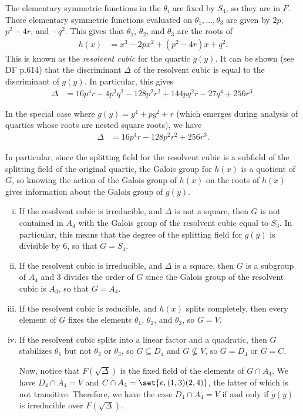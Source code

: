 \documentclass[10pt]{mypackage}
\begin{document}
The elementary symmetric functions in the $\theta_i$ are fixed by $S_4$, so they are in $F$. These elementary symmetric functions evaluated on $\theta_1,\dots,\theta_3$ are given by $2p$, $p^2-4r$, and $-q^2$. This gives that $\theta_1$, $\theta_2$, and $\theta_3$ are the roots of
\begin{align*}
  h(x) &= x^3 - 2px^2 + \left( p^2-4r \right)x + q^2.
\end{align*}
This is known as the \textit{resolvent cubic} for the quartic $g(y)$. It can be shown (see DF p.614) that the discriminant $\Delta$ of the resolvent cubic is equal to the discriminant of $g(y)$. In particular, this gives
\begin{align*}
  \Delta &= 16p^{4}r - 4p^3q^2 - 128p^2r^2 + 144pq^2r - 27q^{4} + 256r^3.
\end{align*}
\begin{remark}
  In the special case where $g(y) = y^4 + py^2 + r$ (which emerges during analysis of quartics whose roots are nested square roots), we have
  \begin{align*}
    \Delta &= 16p^{4}r - 128p^2r^2 + 256r^3.
  \end{align*}
\end{remark}
In particular, since the splitting field for the resolvent cubic is a subfield of the splitting field of the original quartic, the Galois group for $h(x)$ is a quotient of $G$, so knowing the action of the Galois group of $h(x)$ on the roots of $h(x)$ gives information about the Galois group of $g(y)$.
\begin{enumerate}[(i)]
  \item If the resolvent cubic is irreducible, and $\Delta$ is not a square, then $G$ is not contained in $A_4$ with the Galois group of the resolvent cubic equal to $S_3$. In particular, this means that the degree of the splitting field for $g(y)$ is divisible by 6, so that $G = S_4$.
  \item If the resolvent cubic is irreducible, and $\Delta$ is a square, then $G$ is a subgroup of $A_4$ and $3$ divides the order of $G$ since the Galois group of the resolvent cubic is $A_3$, so that $G = A_4$.
  \item If the resolvent cubic is reducible, and $h(x)$ splits completely, then every element of $G$ fixes the elements $\theta_1$, $\theta_2$, and $\theta_3$, so $G = V$.
  \item If the resolvent cubic splits into a linear factor and a quadratic, then $G$ stabilizes $\theta_1$ but not $\theta_2$ or $\theta_3$, so $G\subseteq D_4$ and $G\nsubseteq V$, so $G = D_4$ or $G = C$.

    Now, notice that $F\left( \sqrt{\Delta} \right)$ is the fixed field of the elements of $G\cap A_4$. We have $D_4\cap A_4 = V$ and $C\cap A_4 = \set{e,(1,3)(2,4)}$, the latter of which is not transitive. Therefore, we have the case $D_4\cap A_4 = V$ if and only if $g(y)$ is irreducible over $F\left( \sqrt{\Delta} \right)$.
\end{enumerate}
\end{document}
